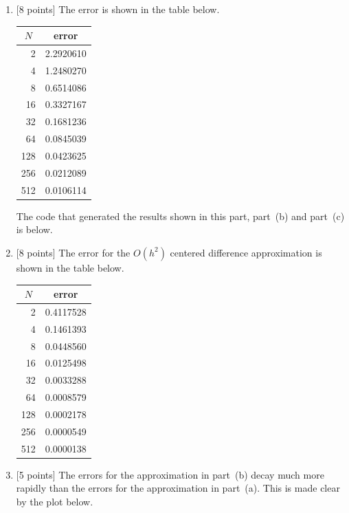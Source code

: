 \begin{solution}

\begin{enumerate}
\item {[8 points]} The error is shown in the table below.
\begin{center}
\begin{tabular}{r|r}
\hline
\multicolumn{1}{c|}{$N$} & \multicolumn{1}{c}{error} \\ 
\hline
   2  &  2.2920610 \\
   4  &  1.2480270 \\
   8  &  0.6514086 \\
  16  &  0.3327167 \\
  32  &  0.1681236 \\
  64  &  0.0845039 \\
 128  &  0.0423625 \\
 256  &  0.0212089 \\
 512  &  0.0106114
\end{tabular}\end{center} 

The code that generated the results shown in this part, part~(b) and part~(c) is below.



\item {[8 points]} 
The error for the $O(h^2)$ centered difference approximation is shown in the table below.
\begin{center}
\begin{tabular}{r|r}
\hline
\multicolumn{1}{c|}{$N$} & \multicolumn{1}{c}{error} \\
\hline
   2 &  0.4117528 \\
   4 &  0.1461393 \\
   8 &  0.0448560 \\
  16 &  0.0125498 \\
  32 &  0.0033288 \\
  64 &  0.0008579 \\
 128 &  0.0002178 \\
 256 &  0.0000549 \\
 512 &  0.0000138
\end{tabular}\end{center}

\item {[5 points]} The errors for the approximation in part~(b) decay much more rapidly than the errors for the approximation in part~(a).
This is made clear by the plot below.


\end{enumerate}
\end{solution}
